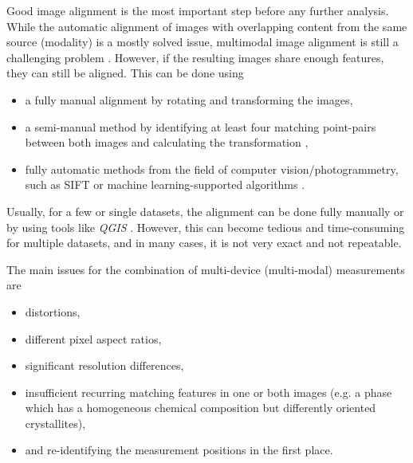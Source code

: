 Good image alignment is the most important step before any further analysis.
While the automatic alignment of images with overlapping content from the same source (modality) is a mostly solved issue, multimodal image alignment is still a challenging problem \cite{frolov.2026}.
However, if the resulting images share enough features, they can still be aligned.
This can be done using
\begin{itemize}
    \item a fully manual alignment by rotating and transforming the images,
    \item a semi-manual method by identifying at least four matching point-pairs between both images and calculating the transformation \cite{hartley.2003},
    \item fully automatic methods from the field of computer vision/photogrammetry, such as \ac{SIFT} \cite{lowe.2004} or machine learning-supported algorithms \cite{frolov.2025, frolov.2026}.
\end{itemize}

Usually, for a few or single datasets, the alignment can be done fully manually or by using tools like \textit{QGIS} \cite{QGIS_software}.
However, this can become tedious and time-consuming for multiple datasets, and in many cases, it is not very exact and not repeatable.

The main issues for the combination of multi-device (multi-modal) measurements are
\begin{itemize}
    \item distortions,
    \item different pixel aspect ratios,
    \item significant resolution differences,
    \item insufficient recurring matching features in one or both images (e.g. a phase which has a homogeneous chemical composition but differently oriented crystallites),
    \item and re-identifying the measurement positions in the first place.
\end{itemize}




